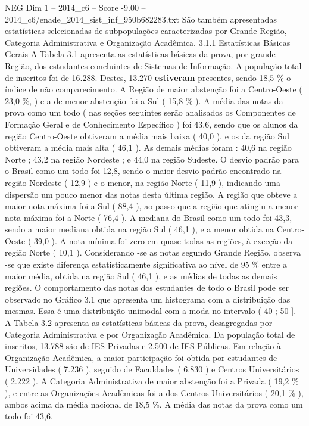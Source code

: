 \begin{textsample}{NEG Dim 1 – 2014\_c6 – Score -9.00 – 2014\_c6/enade\_2014\_sist\_inf\_950b682283.txt}
São também apresentadas estatísticas selecionadas de subpopulações caracterizadas por Grande Região, Categoria Administrativa e Organização Acadêmica. 3.1.1 Estatísticas Básicas Gerais A Tabela 3.1 apresenta as estatísticas básicas da prova, por grande Região, dos estudantes concluintes de Sistemas de Informação.
A população total de inscritos foi de 16.288.
Destes, 13.270 \textbf{estiveram} presentes, sendo 18,5 \% o índice de não comparecimento.
A Região de maior abstenção foi a Centro-Oeste ( 23,0 \%, ) e a de menor abstenção foi a Sul ( 15,8 \% ).
A média das notas da prova como um todo ( nas seções seguintes serão analisados os Componentes de Formação Geral e de Conhecimento Específico ) foi 43,6, sendo que os alunos da região Centro-Oeste obtiveram a média mais baixa ( 40,0 ), e os da região Sul obtiveram a média mais alta ( 46,1 ).
As demais médias foram : 40,6 na região Norte ; 43,2 na região Nordeste ; e 44,0 na região Sudeste.
O desvio padrão para o Brasil como um todo foi 12,8, sendo o maior desvio padrão encontrado na região Nordeste ( 12,9 ) e o menor, na região Norte ( 11,9 ), indicando uma dispersão um pouco menor das notas desta última região.
A região que obteve a maior nota máxima foi a Sul ( 88,4 ), ao passo que a região que atingiu a menor nota máxima foi a Norte ( 76,4 ).
A mediana do Brasil como um todo foi 43,3, sendo a maior mediana obtida na região Sul ( 46,1 ), e a menor obtida na Centro-Oeste ( 39,0 ).
A nota mínima foi zero em quase todas as regiões, à exceção da região Norte ( 10,1 ).
Considerando -se as notas segundo Grande Região, observa -se que existe diferença estatisticamente significativa ao nível de 95 \% entre a maior média, obtida na região Sul ( 46,1 ), e as médias de todas as demais regiões.
O comportamento das notas dos estudantes de todo o Brasil pode ser observado no Gráfico 3.1 que apresenta um histograma com a distribuição das mesmas.
Essa é uma distribuição unimodal com a moda no intervalo ( 40 ; 50 ].
A Tabela 3.2 apresenta as estatísticas básicas da prova, desagregadas por Categoria Administrativa e por Organização Acadêmica.
Da população total de inscritos, 13.788 são de IES Privadas e 2.500 de IES Públicas.
Em relação à Organização Acadêmica, a maior participação foi obtida por estudantes de Universidades ( 7.236 ), seguido de Faculdades ( 6.830 ) e Centros Universitários ( 2.222 ).
A Categoria Administrativa de maior abstenção foi a Privada ( 19,2 \% ), e entre as Organizações Acadêmicas foi a dos Centros Universitários ( 20,1 \% ), ambos acima da média nacional de 18,5 \%.
A média das notas da prova como um todo foi 43,6.

\end{textsample}
